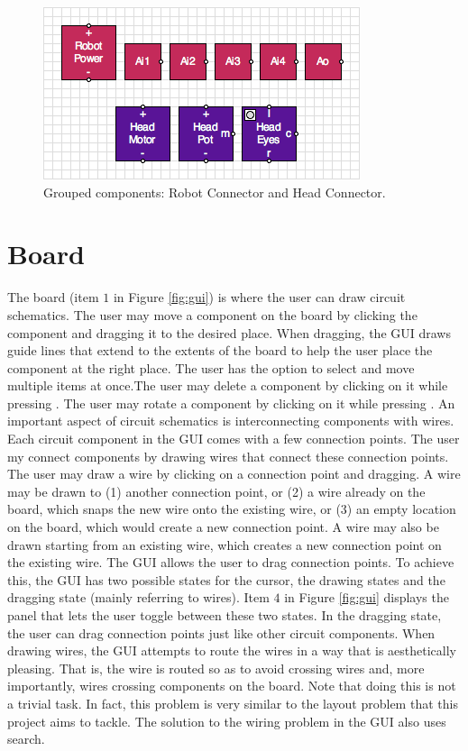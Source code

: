 \begin{figure}
\begin{center}
\includegraphics[scale=0.75]{Images/robot_head_parts.png}
\caption{Grouped components: Robot Connector and Head Connector.}
\label{fig:robot_head_parts}
\end{center}
\end{figure}

\section{Board}

The board (item $1$ in Figure \ref{fig:gui}) is where the user can draw circuit
schematics. The user may move a component on the board by clicking the component
and dragging it to the desired place. When dragging, the GUI draws guide lines
that extend to the extents of the board to help the user place the component
at the right place. The user has the option to select and move multiple items at
once.The user may delete a component by clicking on it while
pressing . The user may rotate a component by clicking on it
while pressing . An important aspect of circuit schematics is
interconnecting components with wires. Each circuit component in the GUI comes
with a few connection points. The user my connect components by drawing wires
that connect these connection points. The user may draw a wire by clicking on a
connection point and dragging. A wire may be drawn to (1) another connection
point, or (2) a wire already on the board, which snaps the new wire onto the
existing wire, or (3) an empty location on the board, which would create a new
connection point. A wire may also be drawn starting from an existing wire,
which creates a new connection point on the existing wire. The GUI allows the
user to drag connection points. To achieve this, the GUI has two possible
states for the cursor, the drawing states and the dragging state (mainly
referring to wires). Item $4$ in Figure \ref{fig:gui} displays the panel that
lets the user toggle between these two states. In the dragging state, the user
can drag connection points just like other circuit components.
When drawing wires,
the GUI attempts to route the wires in a way that is aesthetically pleasing.
That is, the wire is routed so as to avoid crossing wires and, more importantly,
wires crossing components on the board. Note that doing this is not a trivial
task. In fact, this problem is very similar to the layout problem that this
project aims to tackle. The solution to the wiring problem in the GUI also uses
search.

